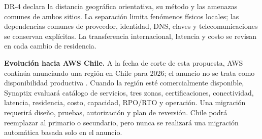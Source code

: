 DR-4 declara la distancia geográfica orientativa, su método y las amenazas comunes de ambos sitios. La separación limita fenómenos físicos locales; las dependencias comunes de proveedor, identidad, DNS, claves y telecomunicaciones se conservan explícitas. La transferencia internacional, latencia y costo se revisan en cada cambio de residencia.

\textbf{Evolución hacia AWS Chile.} A la fecha de corte de esta propuesta, AWS continúa anunciando una región en Chile para 2026; el anuncio no se trata como disponibilidad productiva \parencite{aws-chile}. Cuando la región esté comercialmente disponible, Synaptix evaluará catálogo de servicios, tres zonas, certificaciones, conectividad, latencia, residencia, costo, capacidad, RPO/RTO y operación. Una migración requerirá diseño, pruebas, autorización y plan de reversión. Chile podrá reemplazar al primario o secundario, pero nunca se realizará una migración automática basada solo en el anuncio.

